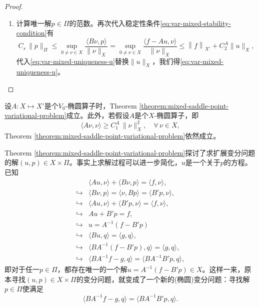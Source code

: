 \begin{proof}
\begin{enumerate}
\begin{enumerate}
\item 计算唯一解$p \in \Pi$的范数。再次代入稳定性条件\eqref{eq:var-mixed-stability-condition}有
\begin{equation*}
  C_s \, \big\| p  \big\|_{\Pi}
  \le \sup_{0 \neq \nu \in X} \frac{
  \langle B \nu, p  \rangle
  }{
  \big\| \nu \big\|_{X}
  }
  = \sup_{0 \neq \nu \in X} \frac{
  \langle f - A u, \nu  \rangle
  }{
  \big\| \nu \big\|_{X}
  }
  \le \left\| f \right\|_{X'} + C_2^A \big\| u \big\|_{X},
\end{equation*}
代入\eqref{eq:var-mixed-uniqueness-u}替换$\big\| u \big\|_{X}$，我们得\eqref{eq:var-mixed-uniqueness-u}。
\end{enumerate}
\end{enumerate}
\end{proof}

设$A:X \mapsto X'$是个$V_0$-椭圆算子时，Theorem \ref{theorem:mixed-saddle-point-variational-problem}成立。此外，若假设$A$是个$X$-椭圆算子，即
\begin{equation}
  \label{eq:var-mixed-ellipcity-AX}
  \langle A \nu, \nu \rangle \ge C_1^A \, \big\| \nu \big\|_{X}^2, \quad \forall \, \nu \in X,
\end{equation}
Theorem \ref{theorem:mixed-saddle-point-variational-problem}依然成立。

Theorem \ref{theorem:mixed-saddle-point-variational-problem}探讨了求扩展变分问题的解$(u,p)\in X \times \Pi$。事实上求解过程可以进一步简化，$u$是一个关于$p$的方程。已知
\begin{equation*}
  \begin{split}
    & \langle A u, \nu \rangle + \langle B \nu, p \rangle = \langle f, \nu \rangle, \\
    \hookrightarrow & \langle B \nu, p \rangle = \langle \nu, B p \rangle = \langle B' p, \nu \rangle, \\
    \hookrightarrow & \langle A u, \nu \rangle + \langle B' p,  \nu \rangle =  \langle f, \nu \rangle, \\
    \hookrightarrow & A u + B ' p = f, \\
    \hookrightarrow & u = A^{-1} \left( f-B'p \right)\\
    \hookrightarrow & \langle B u, q \rangle = \langle g,q\rangle,\\
    \hookrightarrow & \langle B A^{-1} \left( f-B'p \right), q \rangle = \langle g, q \rangle, \\
    \hookrightarrow & \langle B A^{-1} f - g, q \rangle = \langle B A^{-1} B' p, q \rangle,
  \end{split}
\end{equation*}
即对于任一$p \in \Pi$，都存在唯一的一个解$u = A^{-1} \left( f - B' p \right) \in X$。这样一来，原本寻找$(u,p)\in X \times \Pi$的变分问题，就变成了一个新的(椭圆)变分问题：寻找解$p \in \Pi$使满足
\begin{equation}
  \label{eq:var-mixed-var-probl-givenuforq}
  \langle B A^{-1} f - g, q \rangle = \langle B A^{-1} B' p, q \rangle.
\end{equation}

